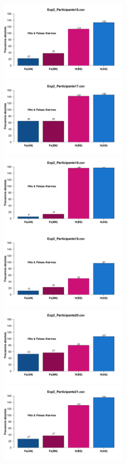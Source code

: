 \documentclass[a4paper ]{article}
\begin{document}
\begin{figure}[th]
\begin{center}
\includegraphics[width=8cm, height=4cm]{Figures/MirrorRate_Exp2_P16} \includegraphics[width=8cm, height=4cm]{Figures/MirrorRate_Exp2_P17} \includegraphics[width=8cm, height=4cm]{Figures/MirrorRate_Exp2_P18}
\includegraphics[width=8cm, height=4cm]{Figures/MirrorRate_Exp2_P19} \includegraphics[width=8cm, height=4cm]{Figures/MirrorRate_Exp2_P20} \includegraphics[width=8cm, height=4cm]{Figures/MirrorRate_Exp2_P21}
\end{center}
\end{figure}
\end{document}
